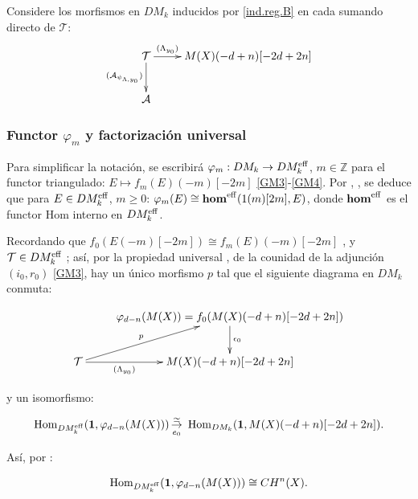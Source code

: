 \documentclass[10pt]{amsart}
\theoremstyle{definition}
\theoremstyle{remark}
\theoremstyle{definition}
\begin{document}
Considere los morfismos en $DM_{k}$ inducidos por \ref{ind.reg.B} en cada sumando directo de $\mathcal{T}$:
\begin{align}  \label{diag.starting}
\begin{split}
\xymatrix{\mathcal T \ar[r]^-{(\Lambda _{y_0})}
\ar[d]_-{(\mathcal A _{\psi _{\Lambda , y_0}})}& M(X)(-d+n)[-2d+2n]\\
\mathcal A &}
\end{split}
\end{align}


\subsubsection{Functor $\varphi_{m}$ y factorización universal }\label{3.2.7} Para simplificar la notación, se escribirá $\varphi_{m}:DM_{k}\to DM_{k}^{\rm eff}$, $m\in\mathbb{Z}$ para el functor triangulado: $E\mapsto f_{m}(E)(-m)[-2m]$ \ref{GM3}-\ref{GM4}. Por \cite[Lem. 5.9]{Voe10b}, \cite[Prop. 1.1]{HK06}, se deduce que para $E\in DM_{k}^{\rm eff}$, $m\geq 0$: $\varphi_{m}(E)\cong{\bf hom}^{\rm eff}(1(m)[2m],E)$, donde ${\bf hom}^{\rm eff}$ es el functor Hom interno en $DM_{k}^{\rm eff}$.

Recordando que $f_{0}(E(-m)[-2m])\cong f_{m}(E)(-m)[-2m]$ \cite[3.3.3(2)]{Pel17}, y $\mathcal{T}\in DM_{k}^{\rm eff}$  \label{ind.reg.B1}; así, por la propiedad universal \cite[3.3.1]{Pel17}, de la counidad de la adjunción $(i_{0},r_{0})$ \ref{GM3}, hay un único morfismo $p$ tal que el siguiente diagrama en $DM_{k}$ conmuta:

\begin{align}  \label{diag.modeffcov}
\begin{split}
\xymatrix{ & \varphi _{d-n}(M(X))= f_0(M(X)(-d+n)[-2d+2n]) 
\ar[d]^-{\epsilon _0}\\
\mathcal T \ar[r]_-{(\Lambda _{y_0})} \ar[ur]^-p& M(X)(-d+n)[-2d+2n]}
\end{split}
\end{align}

y un isomorfismo:

\begin{equation}
{\rm Hom}_{DM_{k}^{\rm eff}}({\bf 1},\varphi_{d-n}(M(X)))\mathop{\buildrel \simeq\over{\rightarrow}}_{e_{0}}\ {\rm Hom}_{DM_{k}}({\bf 1},M(X)(-d+n)[-2d+2 n]).
\end{equation}


Así, por \cite[Prop. 2.1.4, Thm. 3.2.6]{Voe00b}:

\begin{equation}\label{IS}
{\rm Hom}_{DM_{k}^{\rm eff}}({\bf 1},\varphi_{d-n}(M(X)))\cong CH^{n}(X).
\end{equation}
\end{document}

